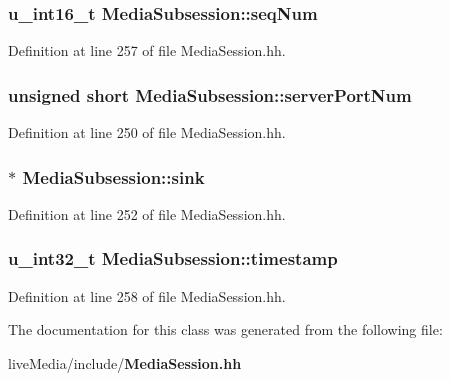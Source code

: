 \subsubsection[{seq\+Num}]{\setlength{\rightskip}{0pt plus 5cm}u\+\_\+int16\+\_\+t Media\+Subsession\+::seq\+Num}\label{classMediaSubsession_aecd35ba1ea69d85528ef3e3e24f4a1e1}


Definition at line 257 of file Media\+Session.\+hh.

\subsubsection[{server\+Port\+Num}]{\setlength{\rightskip}{0pt plus 5cm}unsigned short Media\+Subsession\+::server\+Port\+Num}\label{classMediaSubsession_a20f268c38f579377bd255600c77a5aed}


Definition at line 250 of file Media\+Session.\+hh.

\subsubsection[{sink}]{$\ast$ Media\+Subsession\+::sink}\label{classMediaSubsession_a421c220c93314e8b06a2773d58e52019}


Definition at line 252 of file Media\+Session.\+hh.

\subsubsection[{timestamp}]{\setlength{\rightskip}{0pt plus 5cm}u\+\_\+int32\+\_\+t Media\+Subsession\+::timestamp}\label{classMediaSubsession_af707ff0a14361e7d8dca33d3dfd12ab0}


Definition at line 258 of file Media\+Session.\+hh.



The documentation for this class was generated from the following file\+:\begin{DoxyCompactItemize}
\item 
live\+Media/include/{\bf Media\+Session.\+hh}\end{DoxyCompactItemize}
